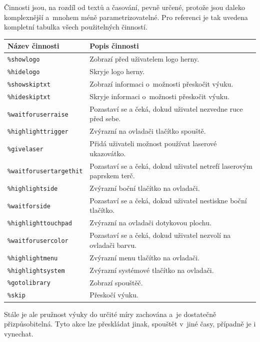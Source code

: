 \newpage

Činnosti jsou, na rozdíl od textů a časování, pevně určené, protože jsou
daleko komplexnější a~mnohem méně parametrizovatelné. Pro referenci je
tak uvedena kompletní tabulka všech použitelných činností.

\begin{longtabu} to \textwidth {XX}
\toprule

Název činnosti
& 
Popis činnosti
\tabularnewline
\midrule
\endhead
\texttt{\%showlogo}
& 
Zobrazí před uživatelem logo herny.
\tabularnewline

\texttt{\%hidelogo}
& 
Skryje logo herny.
\tabularnewline

\texttt{\%showskiptxt}
& 
Zobrazí informaci o~možnosti přeskočit výuku.
\tabularnewline

\texttt{\%hideskiptxt}
& 
Skryje informaci o~možnosti přeskočit výuku.
\tabularnewline

\texttt{\%waitforuserraise}
& 
Pozastaví se a čeká, dokud uživatel nezvedne ruce před sebe.
\tabularnewline

\texttt{\%highlighttrigger}
& 
Zvýrazní na ovladači tlačítko spouště.
\tabularnewline

\texttt{\%givelaser}
& 
Přidá uživateli možnost používat laserové ukazovátko.
\tabularnewline

\texttt{\%waitforusertargethit}
& 
Pozastaví se a čeká, dokud uživatel netrefí laserovým paprskem
terč.
\tabularnewline

\texttt{\%highlightside}
& 
Zvýrazní boční tlačítko na ovladači.
\tabularnewline

\texttt{\%waitforside}
& 
Pozastaví se a čeká, dokud uživatel nestiskne boční tlačítko.
\tabularnewline

\texttt{\%highlighttouchpad}
& 
Zvýrazní na ovladači dotykovou plochu.
\tabularnewline

\texttt{\%waitforusercolor}
& 
Pozastaví se a čeká, dokud uživatel nezvolí na ovladači barvu.
\tabularnewline

\texttt{\%highlightmenu}
& 
Zvýrazní menu tlačítko na ovladači.
\tabularnewline

\texttt{\%highlightsystem}
& 
Zvýrazní systémové tlačítko na ovladači.
\tabularnewline

\texttt{\%gotolibrary}
& 
Zobrazí spouštěč.
\tabularnewline

\texttt{\%skip}
& 
Přeskočí výuku.
\tabularnewline
\bottomrule
\end{longtabu}

Stále je ale pružnost výuky do určité míry zachována a~je dostatečně
přizpůsobitelná. Tyto akce lze přeskládat jinak, spouštět v~jiné časy,
případně je i vynechat.

